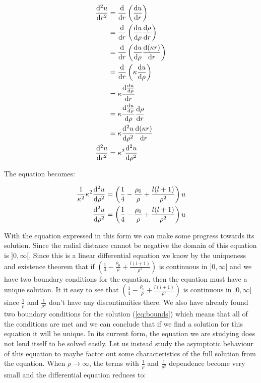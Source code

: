 \documentclass{article}
\begin{document}
    \begin{align}
        \odv[order = 2]{u}{r} &= \odv{}{r}\left( \odv{u}{r} \right) \\
        &= \odv{}{r}\left( \odv{u}{\rho}\odv{\rho}{r} \right) \\
        &= \odv{}{r}\left( \odv{u}{\rho}\odv{(\kappa r)}{r} \right) \\
        &= \odv{}{r}\left( \kappa\odv{u}{\rho} \right) \\
        &= \kappa\odv{\odv{u}{\rho}}{r} \\
        &= \kappa\odv{\odv{u}{\rho}}{\rho}\odv{\rho}{r} \\
        &= \kappa\odv[order = 2]{u}{\rho}\odv{(\kappa r)}{r} \\
        \odv[order = 2]{u}{r} &= \kappa^2\odv[order = 2]{u}{\rho}
    \end{align}

    The equation becomes:

    \begin{align}
        \frac{1}{\kappa^2}\kappa^2\odv[order = 2]{u}{\rho} &= \left(\frac{1}{4} - \frac{\rho_{0}}{\rho} + \frac{l(l + 1)}{\rho^2}\right)u \\
        \odv[order = 2]{u}{\rho} &= \left(\frac{1}{4} - \frac{\rho_{0}}{\rho} + \frac{l(l + 1)}{\rho^2}\right)u
    \end{align}

    With the equation expressed in this form we can make some progress towards its solution. Since the radial distance cannot be negative the domain of this equation is $]0, \infty[$. Since this is 
    a linear differential equation we know by the uniqueness and existence theorem that if $\left( \frac{1}{4} - \frac{\rho_{0}}{\rho} + \frac{l(l+1)}{\rho^2} \right)$ is continuous in $]0, \infty[$
    and we have two boundary conditions for the equation, then the equation must have a unique solution. It it easy to see that $\left( \frac{1}{4} - \frac{\rho_{0}}{\rho} + \frac{l(l+1)}{\rho^2} \right)$
    is continuous in $]0, \infty[$ since $\frac{1}{\rho}$ and $\frac{1}{\rho^2}$ don't have any discontinuities there. We also have already found two boundary conditions for the solution (\ref{eq:bounds})
    which means that all of the conditions are met and we can conclude that if we find a solution for this equation it will be unique. In its current form, the equation we are studying does not
    lend itself to be solved easily. Let us instead study the asymptotic behaviour of this equation to maybe factor out some characteristics of the full solution from the equation.
    When $\rho \to \infty$, the terms with $\frac{1}{\rho}$ and $\frac{1}{\rho^2}$ dependence become very small and the differential equation reduces to:
\end{document}
